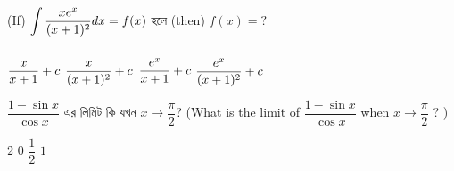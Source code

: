 \documentclass[addpoints]{exam}
\begin{document}
\begin{questions}
\begin{oneparchoices}
\end{oneparchoices}

\question (If) $\mathlarger{\int\limits_{}^{} \frac{xe^{x}}{(x+1)^2}dx = f(x)}$  হলে (then) $f(x)=?$

\begin{oneparchoices}
 \choice $\mathlarger{\frac{x}{x+1} +c}$
 \choice $\mathlarger{\frac{x}{(x+1)^2} +c}$
 \choice $\mathlarger{\frac{e^x}{x+1} +c}$
\choice $\mathlarger{\frac{e^x}{(x+1)^2} +c}$
\end{oneparchoices}

\question  $ \dfrac{1-\sin x}{\cos x} $ এর লিমিট কি যখন $ x\to \dfrac{\pi}{2} $? (What is the limit of $ \dfrac{1-\sin x}{\cos x} $ when $ x\to \dfrac{\pi}{2} $ ? )  

\begin{oneparchoices}
\choice $ 2 $
\choice $ 0 $
\choice $ \dfrac{1}{2} $
\choice $ 1 $
\end{oneparchoices}

\end{questions}
\end{document}
